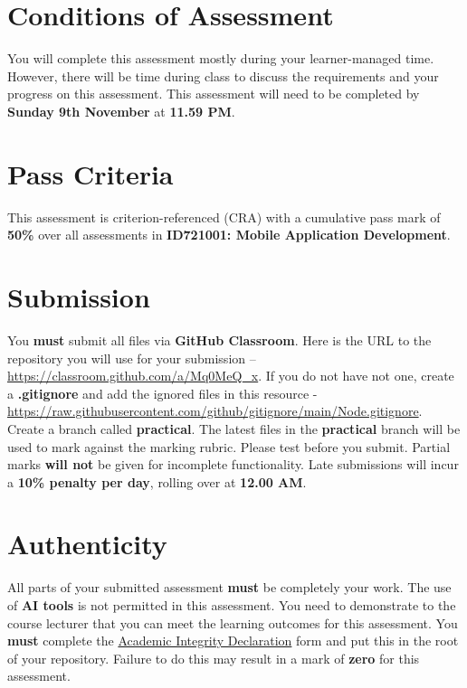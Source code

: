 \documentclass{article}
\begin{document}
\section*{Conditions of Assessment}
You will complete this assessment mostly during your learner-managed time. However, there will be time during class to discuss the requirements and your progress on this assessment. This assessment will need to be completed by \textbf{Sunday 9th November} at \textbf{11.59 PM}. 

\section*{Pass Criteria}
This assessment is criterion-referenced (CRA) with a cumulative pass mark of \textbf{50\%} over all assessments in \textbf{ID721001: Mobile Application Development}. 

\section*{Submission}
You \textbf{must} submit all files via \textbf{GitHub Classroom}. Here is the URL to the repository you will use for your submission – \href{https://classroom.github.com/a/Mq0MeQ\_x}{https://classroom.github.com/a/Mq0MeQ\_x}. If you do not have not one, create a \textbf{.gitignore} and add the ignored files in this resource - \href{https://raw.githubusercontent.com/github/gitignore/main/Node.gitignore}{https://raw.githubusercontent.com/github/gitignore/main/Node.gitignore}. \\

Create a branch called \textbf{practical}. The latest files in the \textbf{practical} branch will be used to mark against the marking rubric. Please test before you submit. Partial marks \textbf{will not} be given for incomplete functionality. Late submissions will incur a \textbf{10\% penalty per day}, rolling over at \textbf{12.00 AM}.

\section*{Authenticity}
All parts of your submitted assessment \textbf{must} be completely your work. The use of \textbf{AI tools} is not permitted in this assessment. You need to demonstrate to the course lecturer that you can meet the learning outcomes for this assessment. You \textbf{must} complete the \href{https://moodle.op.ac.nz/mod/page/view.php?id=1178172}{Academic Integrity Declaration} form and put this in the root of your repository. Failure to do this may result in a mark of \textbf{zero} for this assessment.
\end{document}
